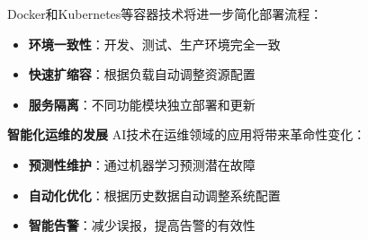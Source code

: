 Docker和Kubernetes等容器技术将进一步简化部署流程： \begin{itemize} \tightlist \item \textbf{环境一致性}：开发、测试、生产环境完全一致 \item
\textbf{快速扩缩容}：根据负载自动调整资源配置 \item \textbf{服务隔离}：不同功能模块独立部署和更新 \end{itemize} \textbf{智能化运维的发展} AI技术在运维领域的应用将带来革命性变化：
\begin{itemize} \tightlist \item \textbf{预测性维护}：通过机器学习预测潜在故障 \item \textbf{自动化优化}：根据历史数据自动调整系统配置 \item
\textbf{智能告警}：减少误报，提高告警的有效性 \end{itemize}
